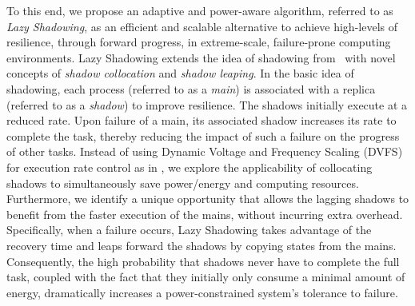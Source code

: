 To this end, we propose an adaptive and power-aware algorithm, referred to as \textit{Lazy
Shadowing}, as an efficient and scalable alternative to achieve high-levels of resilience, through
forward progress, in extreme-scale, failure-prone computing environments. 
Lazy Shadowing extends the idea of shadowing from~\cite{mills_2014_icnc,cui_en7085151,cui_2014_closer} with novel concepts of \textit{shadow collocation} and \textit{shadow leaping}. 
In the basic idea of shadowing, each process (referred to as a \textit{main}) is associated with a replica (referred to as a \textit{shadow}) to improve resilience. %
The shadows initially execute at a reduced rate. %
Upon failure of a main, its associated shadow increases its rate to complete the task, thereby reducing the impact of such a failure on the progress of other tasks.
Instead of using Dynamic Voltage and Frequency Scaling (DVFS) for execution rate control as in \cite{mills_2014_icnc,cui_en7085151,cui_2014_closer}, we explore the applicability of collocating shadows to simultaneously save power/energy and computing resources. Furthermore, we identify a unique opportunity %
that allows the lagging shadows to benefit from the faster execution of the mains, without incurring extra  overhead.
Specifically, when a failure occurs, Lazy Shadowing takes advantage of the recovery time and leaps forward the shadows by copying states from the mains. Consequently, the high probability that shadows never have to complete the full task, coupled with the fact that 
they initially only consume a minimal amount of energy, 
dramatically increases a power-constrained system's tolerance to failure.

